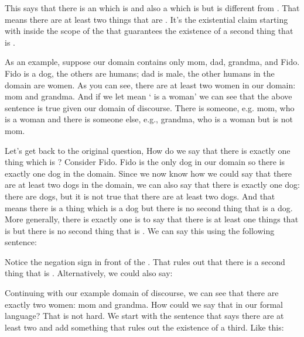 \begin{argument}
\aitem {}
\end{argument}

This says   that there is an  which is  and also a  which is 
but is different from . That means there are at least two things that are  
. It's the existential claim starting with  inside the scope 
of the  that guarantees the existence of a second thing that is 
. 

As an example, suppose our domain contains only mom, dad, grandma, and Fido.  
Fido is a dog, the others are humans; dad is male, the other humans in the 
domain are women. As you can see, there are at least two women in our domain: 
mom and grandma. And if we let  mean ` is a woman' we can see that 
the above sentence is true given our domain of discourse. There is someone, e.g.  
mom, who is a woman and there is someone else, e.g., grandma, who is a woman but 
is not mom.

Let's get back to the original question, How do we say that there is exactly one 
thing which is ? Consider Fido.  Fido is the only dog in our domain so 
there is exactly one dog in the domain.  Since we now know how we could say that 
there are at least two dogs in the domain, we can also say that there is exactly 
one dog: there are dogs, but it is not true that there are at least two dogs.  
And that means there is a thing which is a dog but there is no second thing that 
is a dog. More generally, there is exactly one  is to say that there is at 
least one things that is  but there is no second thing that is  .  We 
can say this using the following sentence:
\begin{argument}
\aitem   {}

\end{argument}

Notice the negation sign in front of the . That rules out that 
there is a second thing that is .  Alternatively, we could also say:

\begin{argument}
 
 \aitem  {}

\end{argument}


Continuing with our example domain of discourse, we can see that there are 
exactly two women: mom and grandma. How could we say that in our formal language?  
That is not hard. We start with the sentence that says there are at least two 
and add something that rules out the existence of a third. Like this:
\begin{argument}

\aitem {}

\end{argument}


